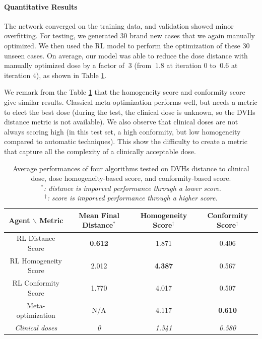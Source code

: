 \paragraph{Quantitative Results}
The network converged on the training data, and validation showed minor overfitting.
For testing, we generated 30 brand new cases that we again manually optimized.
We then used the RL model to perform the optimization of these 30 unseen cases.
On average, our model was able to reduce the dose distance with manually optimized dose by a factor of $~3$ (from $~1.8$ at iteration $0$ to $~0.6$ at iteration $4$), as shown in Table \ref{table:results}.

We remark from the Table \ref{table:results} that the homogeneity score and conformity score give similar results.
Classical meta-optimization performs well, but needs a metric to elect the best dose (during the test, the clinical dose is unknown, so the DVHs distance metric is not available).
We also observe that clinical doses are not always scoring high (in this test set, a high conformity, but low homogeneity compared to automatic techniques).
This show the difficulty to create a metric that capture all the complexity of a clinically acceptable dose.

\begin{table}
	\begin{center}
		\begin{tabular}{| c || c | c | c |} 
			\hline
			Agent $\backslash$ Metric & Mean Final Distance$^*$ & Homogeneity Score$^\dagger$ & Conformity Score$^\dagger$ \\ 
			\hline
			RL Distance Score & \textbf{0.612} & 1.871 & 0.406 \\ 
			RL Homogeneity Score & 2.012 & \textbf{4.387} & 0.567 \\
			RL Conformity Score &  1.770  & 4.017 & 0.507 \\
			Meta-optimization & N/A & 4.117 & \textbf{0.610} \\
			\textit{Clinical doses} & \textit{0} & \textit{1.541} & \textit{0.580} \\	
			\hline
		\end{tabular}
		\label{table:results}
	\end{center}
	\caption{
		Average performances of four algorithms tested on DVHs distance to clinical dose, dose homogeneity-based score, and conformity-based score.\\
		\textit{$^*$: distance is imporved performance through a lower score.} \\
		\textit{$^\dagger$: score is imporved performance through a higher score.}
	}
\end{table}

